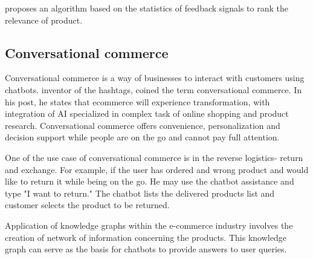 \parencite{KarmakerSantu.2017} proposes an algorithm based on the statistics of feedback signals to rank the relevance of product. 


\subsection*{Conversational commerce}

 Conversational commerce is a way of businesses to interact with customers using chatbots. \parencite{ChrisMessina} inventor of the hashtags, coined the term conversational commerce. In his post, he states that ecommerce will experience transformation, with integration of \acf{AI} specialized in complex task of online shopping and product research.  Conversational commerce offers convenience, personalization and decision support while people are on the go and cannot pay full attention.  
 
 One of the use case of conversational commerce is in the reverse logistics- return and exchange. For example, if the user has ordered and wrong product and would like to return it while being on the go. He may use the chatbot assistance and type "I want to return." The chatbot lists the delivered products list and customer selects the product to be returned. 



 
Application of knowledge graphs within the e-commerce industry involves the creation of network of information concerning the products. This knowledge graph can serve as the basis for chatbots to provide answers to user queries. 